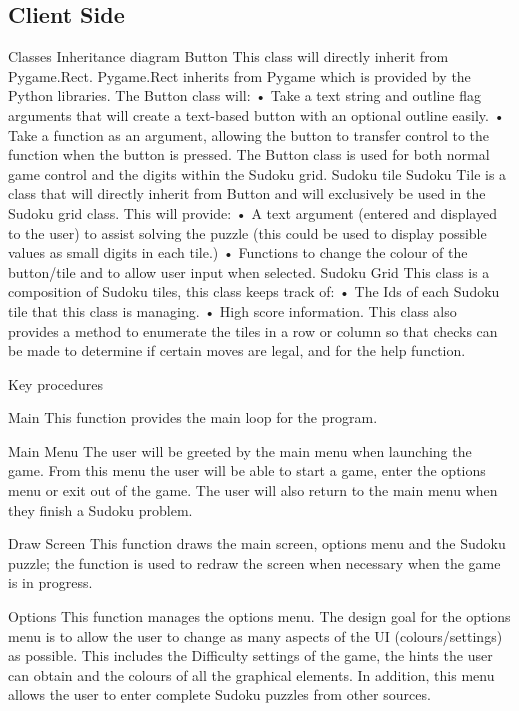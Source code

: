 \documentclass[fleqn]{article}
\begin{document}
\subsection{Client Side}
Classes
Inheritance diagram
Button
This class will directly inherit from Pygame.Rect. Pygame.Rect inherits from Pygame which is provided by the Python libraries. The Button class will:
•	Take a text string and outline flag arguments that will create a text-based button with an optional outline easily.
•	Take a function as an argument, allowing the button to transfer control to the function when the button is pressed.
The Button class is used for both normal game control and the digits within the Sudoku grid.
Sudoku tile
Sudoku Tile is a class that will directly inherit from Button and will exclusively be used in the Sudoku grid class. This will provide:
•	A text argument (entered and displayed to the user) to assist solving the puzzle (this could be used to display possible values as small digits in each tile.)
•	Functions to change the colour of the button/tile and to allow user input when selected.
Sudoku Grid
This class is a composition of Sudoku tiles, this class keeps track of:
•	The Ids of each Sudoku tile that this class is managing.
•	High score information.
This class also provides a method to enumerate the tiles in a row or column so that checks can be made to determine if certain moves are legal, and for the help function.













Key procedures
 
 


Main
This function provides the main loop for the program. 

Main Menu
The user will be greeted by the main menu when launching the game. From this menu the user will be able to start a game, enter the options menu or exit out of the game. The user will also return to the main menu when they finish a Sudoku problem.

Draw Screen
This function draws the main screen, options menu and the Sudoku puzzle; the function is used to redraw the screen when necessary when the game is in progress.
 
Options
This function manages the options menu. The design goal for the options menu is to allow the user to change as many aspects of the UI (colours/settings) as possible. This includes the Difficulty settings of the game, the hints the user can obtain and the colours of all the graphical elements. In addition, this menu allows the user to enter complete Sudoku puzzles from other sources.
 
\end{document}
